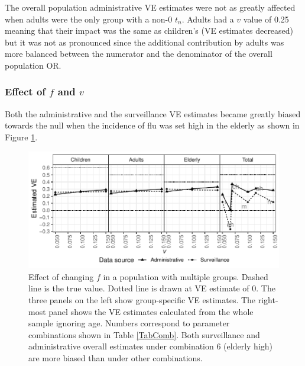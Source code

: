 \documentclass[11pt]{article}
\begin{document}
The overall population administrative VE estimates were not as greatly affected when adults were the only group with a non-0 $t_n$. Adults had a $v$ value of 0.25 meaning that their impact was the same as children's (VE estimates decreased) but it was not as pronounced since the additional contribution by adults was more balanced between the numerator and the denominator of the overall population OR.

\pagebreak
\subsubsection{Effect of $f$ and $v$}

Both the administrative and the surveillance VE estimates became greatly biased towards the null when the incidence of flu was set high in the elderly as shown in Figure \ref{fig:agesmult-pflu}.

\begin{figure}[h]
	\centering
		\includegraphics[width=1\linewidth]{../fig-agesmult/agesmult-pflu.pdf}
		\caption{
Effect of changing $f$ in a population with multiple groups. Dashed line is the true value. Dotted line is drawn at VE estimate of 0. The three panels on the left show group-specific VE estimates. The right-most panel shows the VE estimates calculated from the whole sample ignoring age. Numbers correspond to parameter combinations shown in Table \ref{TabComb}. Both surveillance and administrative overall estimates under combination 6 (elderly high) are more biased than under other combinations. \label{fig:agesmult-pflu}
		}
\end{figure}

\pagebreak
\thispagestyle{plain}

\end{document}
